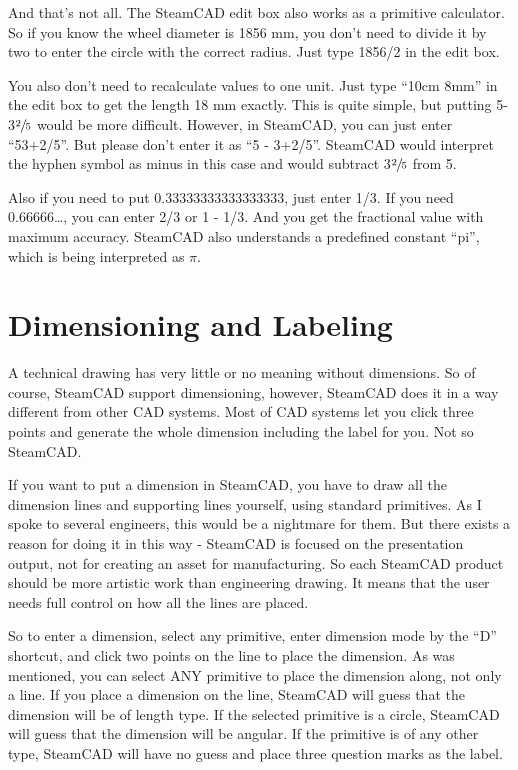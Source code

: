 And that's not all. The SteamCAD edit box also works as a primitive calculator.
So if you know the wheel diameter is 1856 mm, you don't need to divide it by two
to enter the circle with the correct radius. Just type 1856/2 in the edit box.

You also don't need to recalculate values to one unit. Just type ``10cm 8mm'' in the
edit box to get the length 18 mm exactly. This is quite simple, but putting
5\primitiveApostophe{}-3$\sfrac{2}{5}$\primitiveQuote{} would be more difficult. However,
in SteamCAD, you can just enter ``5\primitiveApostophe{}3+2/5\primitiveQuote''. But
please don't enter it as ``5\primitiveApostophe{} - 3+2/5\primitiveQuote''. SteamCAD
would interpret the hyphen symbol as minus in this case and would subtract
3$\sfrac{2}{5}$\primitiveQuote{} from 5\primitiveApostophe.

Also if you need to put 0.33333333333333333, just enter 1/3. If you need 0.66666\dots,
you can enter 2/3 or 1 - 1/3. And you get the fractional value with maximum accuracy.
SteamCAD also understands a predefined constant ``pi'', which is being interpreted
as $\pi$.


\section{Dimensioning and Labeling}

A technical drawing has very little or no meaning without dimensions. So of course,
SteamCAD support dimensioning, however, SteamCAD does it in a way different from
other CAD systems. Most of CAD systems let you click three points and generate the
whole dimension including the label for you. Not so SteamCAD.

If you want to put a dimension in SteamCAD, you have to draw all the dimension
lines and supporting lines yourself, using standard primitives. As I spoke to
several engineers, this would be a nightmare for them. But there exists a reason
for doing it in this way - SteamCAD is focused on the presentation output, not
for creating an asset for manufacturing. So each SteamCAD product should be more
artistic work than engineering drawing. It means that the user needs full control
on how all the lines are placed.

So to enter a dimension, select any primitive, enter dimension mode by the ``D''
shortcut, and click two points on the line to place the dimension. As was mentioned,
you can select ANY primitive to place the dimension along, not only a line. If you
place a dimension on the line, SteamCAD will guess that the dimension will be
of length type. If the selected primitive is a circle, SteamCAD will guess that the
dimension will be angular. If the primitive is of any other type, SteamCAD will
have no guess and place three question marks as the label.

